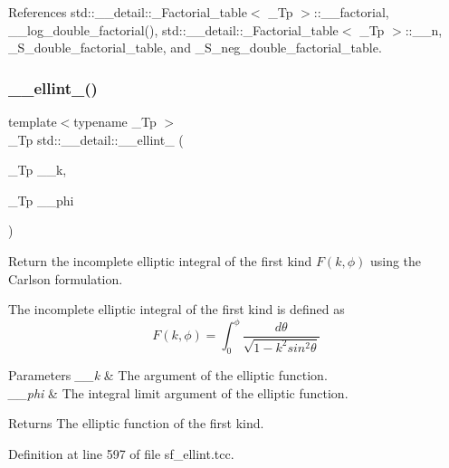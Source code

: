References std\+::\+\_\+\+\_\+detail\+::\+\_\+\+Factorial\+\_\+table$<$ \+\_\+\+Tp $>$\+::\+\_\+\+\_\+factorial, \+\_\+\+\_\+log\+\_\+double\+\_\+factorial(), std\+::\+\_\+\+\_\+detail\+::\+\_\+\+Factorial\+\_\+table$<$ \+\_\+\+Tp $>$\+::\+\_\+\+\_\+n, \+\_\+\+S\+\_\+double\+\_\+factorial\+\_\+table, and \+\_\+\+S\+\_\+neg\+\_\+double\+\_\+factorial\+\_\+table.

\mbox{\label{namespacestd_1_1____detail_aa349fe5bcf36d29cfacf6cd3e8aa65b0}} 
\subsubsection{\texorpdfstring{\+\_\+\+\_\+ellint\+\_()}{\_\_ellint\_1()}}
{\footnotesize\ttfamily template$<$typename \+\_\+\+Tp $>$ \\
\+\_\+\+Tp std\+::\+\_\+\+\_\+detail\+::\+\_\+\+\_\+ellint\+\_ (\begin{DoxyParamCaption}\item[{\+\_\+\+Tp}]{\+\_\+\+\_\+k,  }\item[{\+\_\+\+Tp}]{\+\_\+\+\_\+phi }\end{DoxyParamCaption})}



Return the incomplete elliptic integral of the first kind $ F(k,\phi) $ using the Carlson formulation. 

The incomplete elliptic integral of the first kind is defined as \[ F(k,\phi) = \int_0^{\phi}\frac{d\theta} {\sqrt{1 - k^2 sin^2\theta}} \]


\begin{DoxyParams}{Parameters}
{\em \+\_\+\+\_\+k} & The argument of the elliptic function. \\
\hline
{\em \+\_\+\+\_\+phi} & The integral limit argument of the elliptic function. \\
\hline
\end{DoxyParams}
\begin{DoxyReturn}{Returns}
The elliptic function of the first kind. 
\end{DoxyReturn}


Definition at line 597 of file sf\+\_\+ellint.\+tcc.



